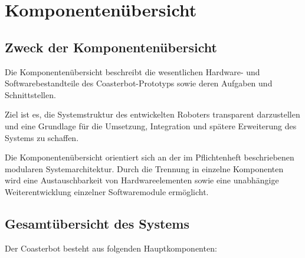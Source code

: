 \documentclass[
  a4paper,
  12pt,
  DIV=12,        %
  parskip=half,  %
  headings=small %
]{scrartcl}
\theoremstyle{definition}
\theoremstyle{definition}
\begin{document}
\section{Komponentenübersicht}\label{komponentenuxfcbersicht}

\subsection{Zweck der
Komponentenübersicht}\label{zweck-der-komponentenuxfcbersicht}

Die Komponentenübersicht beschreibt die wesentlichen Hardware- und
Softwarebestandteile des Coasterbot-Prototyps sowie deren Aufgaben und
Schnittstellen.

Ziel ist es, die Systemstruktur des entwickelten Roboters transparent
darzustellen und eine Grundlage für die Umsetzung, Integration und
spätere Erweiterung des Systems zu schaffen.

Die Komponentenübersicht orientiert sich an der im Pflichtenheft
beschriebenen modularen Systemarchitektur. Durch die Trennung in
einzelne Komponenten wird eine Austauschbarkeit von Hardwareelementen
sowie eine unabhängige Weiterentwicklung einzelner Softwaremodule
ermöglicht.

\subsection{Gesamtübersicht des
Systems}\label{gesamtuxfcbersicht-des-systems}

Der Coasterbot besteht aus folgenden Hauptkomponenten:
\end{document}
